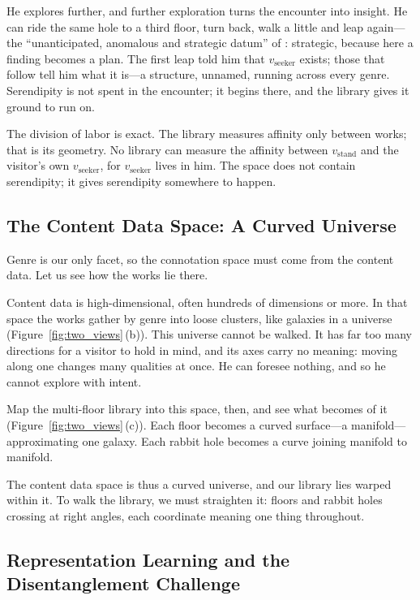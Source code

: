He explores further, and further exploration turns the encounter into insight.
He can ride the same hole to a third floor, turn back, walk a little and leap
again---the ``unanticipated, anomalous and strategic datum'' of
\citet[p.~506]{Merton1948505}: strategic, because here a finding becomes a plan.
The first leap told him that $v_\text{seeker}$ exists; those that follow tell
him what it is---a structure, unnamed, running across every genre. Serendipity
is not spent in the encounter; it begins there, and the library gives it ground
to run on.

The division of labor is exact. The library measures affinity only between
works; that is its geometry. No library can measure the affinity between $v_\text{stand}$ and the
visitor's own $v_\text{seeker}$, for $v_\text{seeker}$ lives in him. The
space does not contain serendipity; it gives serendipity somewhere to happen.


\subsection{The Content Data Space: A Curved
    Universe}\label{subsec:multi_galaxy}

Genre is our only facet, so the connotation space must come from the content
data. Let us see how the works lie there.

Content data is high-dimensional, often hundreds of dimensions or more. In that
space the works gather by genre into loose clusters, like galaxies in a universe
(Figure~\ref{fig:two_views}\,(b)). This universe cannot be walked. It has far
too many directions for a visitor to hold in mind, and its axes carry no
meaning: moving along one changes many qualities at once. He can
foresee nothing, and so he cannot explore with intent.

Map the multi-floor library into this space, then, and see what becomes of it
(Figure~\ref{fig:two_views}\,(c)). Each floor becomes a curved surface---a
manifold---approximating one galaxy. Each rabbit hole becomes a curve joining
manifold to manifold.

The content data space is thus a curved universe, and our library lies warped
within it. To walk the library, we must straighten it: floors and rabbit holes
crossing at right angles, each coordinate meaning one thing throughout.

\subsection{Representation Learning and the Disentanglement
    Challenge}\label{subsec:disentanglement}

